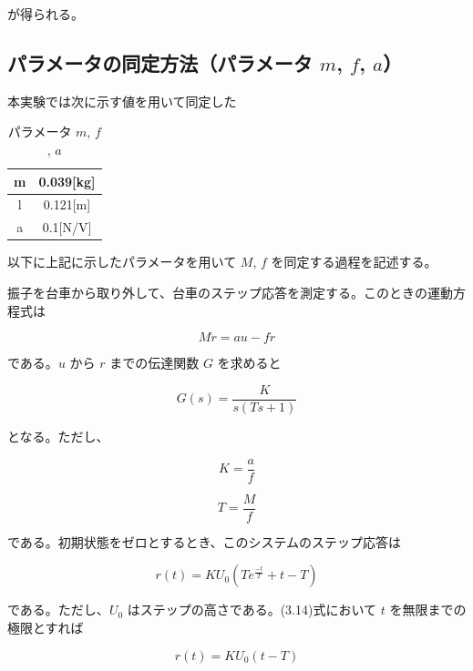 \documentclass[10pt,a4paper,titlepage]{jreport} %
\begin{document}
が得られる。

\subsection{パラメータの同定方法（パラメータ $m$, $f$, $a$）}

本実験では次に示す値を用いて同定した

\begin{table}[htbp]
  \centering
  \caption{パラメータ $m$, $f$, $a$}
  \begin{tabular}{|c|c|}
    \hline
    m & 0.039[kg] \\
    \hline
    l & 0.121[m] \\
    \hline
    a & 0.1[N/V] \\
    \hline
  \end{tabular}
\end{table}

以下に上記に示したパラメータを用いて $M$, $f$ を同定する過程を記述する。

振子を台車から取り外して、台車のステップ応答を測定する。このときの運動方程式は

\begin{equation}
M\ddot{r} = au - f\dot{r}
\end{equation}

である。$u$ から $r$ までの伝達関数 $G$ を求めると

\begin{equation}
G(s) = \frac{K}{s(Ts + 1)}
\end{equation}

となる。ただし、

\begin{equation}
K = \frac{a}{f}
\end{equation}

\begin{equation}
T = \frac{M}{f}
\end{equation}

である。初期状態をゼロとするとき、このシステムのステップ応答は

\begin{equation}
r(t) = KU_0(Te^{\frac{-t}{T}} + t - T)
\end{equation}

である。ただし、$U_0$ はステップの高さである。(3.14)式において $t$ を無限までの
極限とすれば

\begin{equation}
r(t) = KU_0(t - T)
\end{equation}
\end{document}
